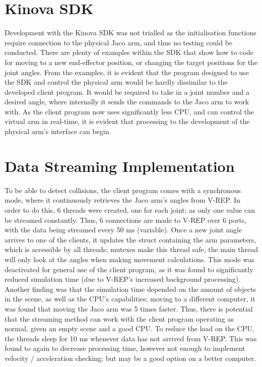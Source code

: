 \documentclass[12pt,openany,a4paper]{book}
\begin{document}
\section{Kinova SDK}
Development with the Kinova SDK was not trialled as the initialisation functions require connection to the physical Jaco arm, and thus no testing could be conducted. There are plenty of examples within the SDK that show how to code for moving to a new end-effector position, or changing the target positions for the joint angles. From the examples, it is evident that the program designed to use the SDK and control the physical arm would be hardly dissimilar to the developed client program. It would be required to take in a joint number and a desired angle, where internally it sends the commands to the Jaco arm to work with. As the client program now uses significantly less CPU, and can control the virtual arm in real-time, it is evident that processing to the development of the physical arm's interface can begin.


\section{Data Streaming Implementation}
To be able to detect collisions, the client program comes with a synchronous mode, where it continuously retrieves the Jaco arm's angles from V-REP. In order to do this, 6 threads were created, one for each joint; as only one value can be streamed constantly. Thus, 6 connections are made to V-REP over 6 ports, with the data being streamed every 50 ms (variable). Once a new joint angle arrives to one of the clients, it updates the struct containing the arm parameters, which is accessible by all threads; mutexes make this thread safe, the main thread will only look at the angles when making movement calculations. This mode was deactivated for general use of the client program, as it was found to significantly reduced simulation time (due to V-REP's increased background processing). Another finding was that the simulation time depended on the amount of objects in the scene, as well as the CPU's capabilities; moving to a different computer, it was found that moving the Jaco arm was 5 times faster. Thus, there is potential that the streaming method can work with the client program operating as normal, given an empty scene and a good CPU. To reduce the load on the CPU, the threads sleep for 10 ms whenever data has not arrived from V-REP. This was found to again to decrease processing time, however not enough to implement velocity / acceleration checking; but may be a good option on a better computer. 
\end{document}
